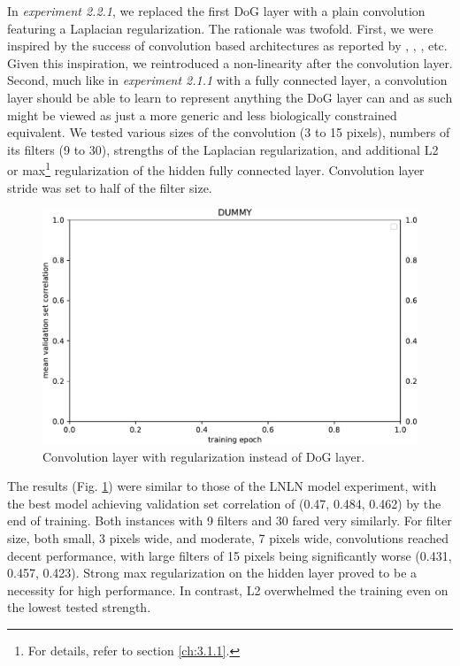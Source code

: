 In \textit{experiment 2.2.1}, we replaced the first DoG layer with a plain convolution featuring a Laplacian regularization. The rationale was twofold. First, we were inspired by the success of convolution based architectures as reported by \cite{klidnt}, \cite{ecker}, \cite{Walke506956}, etc. Given this inspiration, we reintroduced a non-linearity after the convolution layer. Second, much like in \textit{experiment 2.1.1} with a fully connected layer, a convolution layer should be able to learn to represent anything the DoG layer can and as such might be viewed as just a more generic and less biologically constrained equivalent. We tested various sizes of the convolution (3 to 15 pixels), numbers of its filters (9 to 30), strengths of the Laplacian regularization, and additional L2 or max\footnote{For details, refer to section \ref{ch:3.1.1}.} regularization of the hidden fully connected layer. Convolution layer stride was set to half of the filter size.

\begin{figure}[H]
    \centering
    \includegraphics[width=1\textwidth]{../figures/05_dummy}
    \caption[Experiment 2.2.1]{Convolution layer with regularization instead of DoG layer.}
    \label{fig:5.2.2.1}
\end{figure}

The results (Fig. \ref{fig:5.2.2.1}) were similar to those of the LNLN model experiment, with the best model achieving validation set correlation of (0.47, 0.484, 0.462) by the end of training. Both instances with 9 filters and 30 fared very similarly. For filter size, both small, 3 pixels wide, and moderate, 7 pixels wide, convolutions reached decent performance, with large filters of 15 pixels being significantly worse (0.431, 0.457, 0.423). Strong max regularization on the hidden layer proved to be a necessity for high performance. In contrast, L2 overwhelmed the training even on the lowest tested strength. 


